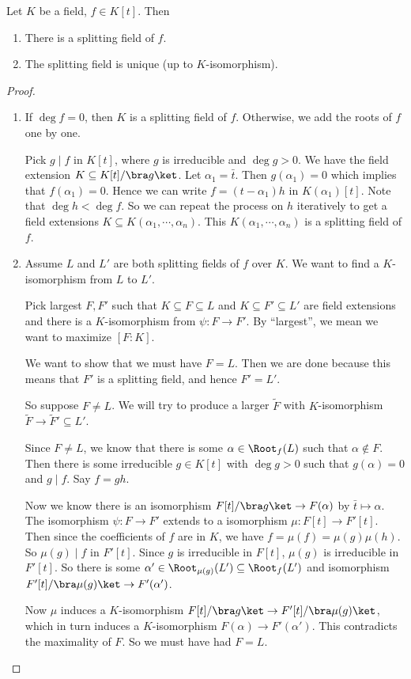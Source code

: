 \documentclass[a4paper]{article}
\begin{document}
\begin{thm}
  Let $K$ be a field, $f\in K[t]$. Then
  \begin{enumerate}
    \item There is a splitting field of $f$.
    \item The splitting field is unique (up to $K$-isomorphism).
  \end{enumerate}
\end{thm}

\begin{proof}\leavevmode
  \begin{enumerate}
    \item If $\deg f = 0$, then $K$ is a splitting field of $f$. Otherwise, we add the roots of $f$ one by one.

      Pick $g \mid f$ in $K[t]$, where $g$ is irreducible and $\deg g > 0$. We have the field extension $K\subseteq K[t]/\bra g\ket$. Let $\alpha_1 = \bar t$. Then $g(\alpha_1) = 0$ which implies that $f(\alpha_1) = 0$. Hence we can write $f = (t - \alpha_1) h$ in $K(\alpha_1)[t]$. Note that $\deg h < \deg f$. So we can repeat the process on $h$ iteratively to get a field extensions $K\subseteq K(\alpha_1, \cdots, \alpha_n)$. This $K(\alpha_1, \cdots, \alpha_n)$ is a splitting field of $f$.

    \item Assume $L$ and $L'$ are both splitting fields of $f$ over $K$. We want to find a $K$-isomorphism from $L$ to $L'$.

      Pick largest $F, F'$ such that $K \subseteq F\subseteq L$ and $K\subseteq F' \subseteq L'$ are field extensions and there is a $K$-isomorphism from $\psi: F \to F'$. By ``largest'', we mean we want to maximize $[F:K]$.

      We want to show that we must have $F = L$. Then we are done because this means that $F'$ is a splitting field, and hence $F' = L'$.

      So suppose $F\not= L$. We will try to produce a larger $\tilde{F}$ with $K$-isomorphism $\tilde{F} \to \tilde{F}' \subseteq L'$.

      Since $F\not= L$, we know that there is some $\alpha \in \Root_f(L)$ such that $\alpha\not\in F$. Then there is some irreducible $g\in K[t]$ with $\deg g > 0$ such that $g(\alpha) = 0$ and $g \mid f$. Say $f = gh$.

      Now we know there is an isomorphism $F[t]/\bra g\ket \to F(\alpha)$ by $\bar t \mapsto \alpha$. The isomorphism $\psi: F \to F'$ extends to a isomorphism $\mu: F[t] \to F'[t]$. Then since the coefficients of $f$ are in $K$, we have $f = \mu(f) = \mu(g)\mu(h)$. So $\mu(g) \mid f$ in $F'[t]$. Since $g$ is irreducible in $F[t]$, $\mu(g)$ is irreducible in $F'[t]$. So there is some $\alpha' \in \Root_{\mu(g)}(L') \subseteq \Root_f(L')$ and isomorphism $F'[t]/\bra \mu(g)\ket \to F'(\alpha')$.

      Now $\mu$ induces a $K$-isomorphism $F[t]/\bra g\ket \to F'[t]/\bra \mu(g)\ket$, which in turn induces a $K$-isomorphism $F(\alpha) \to F'(\alpha')$. This contradicts the maximality of $F$. So we must have had $F = L$.
  \end{enumerate}
\end{proof}
\end{document}
